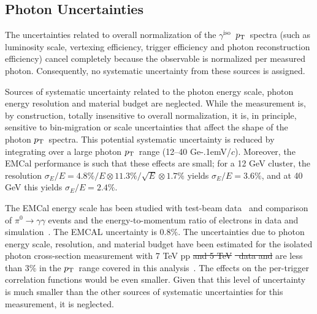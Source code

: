 \documentclass[ALICE,manyauthors]{cernphprep}
\newcommand{\gammaiso}{\ensuremath{\gamma^\mathrm{iso}}}
\newcommand{\pPb}          {\mbox{p--Pb}\xspace}
\newcommand{\pt}           {\ensuremath{p_{\rm T}}\xspace}
\newcommand{\GeVc}         {Ge\kern-.1emV/$c$\xspace}
\providecommand{\DIFaddtex}[1]{{\protect\color{blue}\uwave{#1}}} %
\providecommand{\DIFdeltex}[1]{{\protect\color{red}\sout{#1}}}                      %
\providecommand{\DIFaddbegin}{} %
\providecommand{\DIFaddend}{} %
\providecommand{\DIFdelbegin}{} %
\providecommand{\DIFdelend}{} %
\providecommand{\DIFadd}[1]{\texorpdfstring{\DIFaddtex{#1}}{#1}} %
\providecommand{\DIFdel}[1]{\texorpdfstring{\DIFdeltex{#1}}{}} %
\newcommand{\DIFscaledelfig}{0.5}
\newlength{\DIFdelgraphicswidth} %
\newlength{\DIFdelgraphicsheight} %
\newcommand{\DIFaddincludegraphics}[2][]{{\color{blue}\fbox{\DIFOincludegraphics[#1]{#2}}}} %
\newcommand{\DIFdelincludegraphics}[2][]{%
\sbox{\DIFdelgraphicsbox}{\DIFOincludegraphics[#1]{#2}}%
\settoboxwidth{\DIFdelgraphicswidth}{\DIFdelgraphicsbox} %
\settoboxtotalheight{\DIFdelgraphicsheight}{\DIFdelgraphicsbox} %
\scalebox{\DIFscaledelfig}{%
\parbox[b]{\DIFdelgraphicswidth}{\usebox{\DIFdelgraphicsbox}\\[-\baselineskip] \rule{\DIFdelgraphicswidth}{0em}}\llap{\resizebox{\DIFdelgraphicswidth}{\DIFdelgraphicsheight}{%
\setlength{\unitlength}{\DIFdelgraphicswidth}%
\begin{picture}(1,1)%
\thicklines\linethickness{2pt} %
{\color[rgb]{1,0,0}\put(0,0){\framebox(1,1){}}}%
{\color[rgb]{1,0,0}\put(0,0){\line( 1,1){1}}}%
{\color[rgb]{1,0,0}\put(0,1){\line(1,-1){1}}}%
\end{picture}%
}\hspace*{3pt}}} %
} %
\DeclareRobustCommand{\DIFaddbegin}{\DIFOaddbegin \let\includegraphics\DIFaddincludegraphics} %
\DeclareRobustCommand{\DIFaddend}{\DIFOaddend \let\includegraphics\DIFOincludegraphics} %
\DeclareRobustCommand{\DIFdelbegin}{\DIFOdelbegin \let\includegraphics\DIFdelincludegraphics} %
\DeclareRobustCommand{\DIFdelend}{\DIFOaddend \let\includegraphics\DIFOincludegraphics} %
\begin{document}
\subsection{Photon Uncertainties}
The uncertainties related to overall normalization of the \gammaiso~\pt~spectra (such as luminosity scale, vertexing efficiency, trigger efficiency and photon reconstruction efficiency) cancel completely because the observable is normalized per measured photon. Consequently, no systematic uncertainty from these sources is assigned. 

Sources of systematic uncertainty related to the photon energy scale, photon energy resolution and material budget are neglected. While the measurement is, by construction, totally insensitive to overall normalization, it is, in principle, sensitive to bin-migration or scale uncertainties that affect the shape of the photon \pt~spectra. This potential systematic uncertainty is reduced by integrating over a large photon \pt~range (12--40 \GeVc). Moreover, the EMCal performance is such that these effects are small; for a 12 GeV cluster, the resolution \DIFdelbegin \DIFdel{$\sigma_{E}/E = 4.8\%/E\otimes 11.3\%/\sqrt{E}\otimes 1.7\%$ }\DIFdelend \DIFaddbegin \DIFadd{$\sigma_{E}/E = (4.8\%/E)^2\oplus (11.3\%/\sqrt{E})^2\oplus (1.7\%)^2$ }\DIFaddend yields $\sigma_{E}/E =3.6\%$, and at 40 GeV this yields $\sigma_{E}/E =2.4\%$. 

The EMCal energy scale has been studied with test-beam data~\cite{Allen:2009aa} and comparison of $\pi^{0}\to\gamma\gamma$ events and the energy-to-momentum ratio of electrons in data and simulation~\cite{Adam:2016khe}. The EMCAL uncertainty is 0.8$\%$. The uncertainties due to photon energy scale, resolution, and material budget have been estimated for the isolated photon cross-section measurement with 7 TeV pp \DIFdelbegin \DIFdel{and 5 TeV }%
\DIFdel{~data and }\DIFdelend %
 \DIFaddbegin \DIFadd{and }\DIFaddend are less than 3$\%$ in the \pt~range covered in this analysis~\cite{Acharya:2019jkx}. The effects on the per-trigger correlation functions would be even smaller. Given that this level of uncertainty is much smaller than the other sources of systematic uncertainties for this measurement, it is neglected. \\
\end{document}
